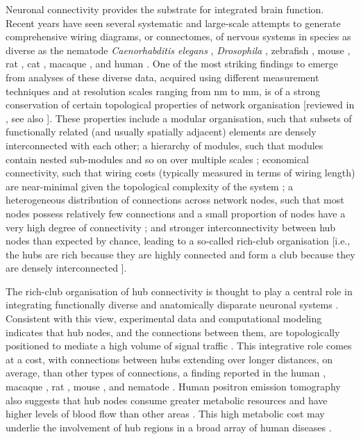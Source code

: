 Neuronal connectivity provides the substrate for integrated brain function.
Recent years have seen several systematic and large-scale attempts to generate comprehensive wiring diagrams, or connectomes, of nervous systems \citep{VandenHeuvel2016} in species as diverse as the nematode \emph{Caenorhabditis elegans} \citep{White1986, Varshney2011}, \emph{Drosophila} \citep{Chiang2011a, Shih2015}, zebrafish \citep{Wanner2016, Hildebrand2017}, mouse \citep{Oh2014, Zingg2014}, rat \citep{Bota2015}, cat \citep{Scannell1995}, macaque \citep{Markov2014, Stephan2001}, and human \citep{Hagmann2008, VanEssen2013}.
One of the most striking findings to emerge from analyses of these diverse data, acquired using different measurement techniques and at resolution scales ranging from nm to mm, is of a strong conservation of certain topological properties of network organisation [reviewed in \citep{Bullmore2009, Bullmore2012, Sporns2011, VandenHeuvel2016b, Schroter2017}, see also \citep{Fornito2016}].
These properties include a modular organisation, such that subsets of functionally related (and usually spatially adjacent) elements are densely interconnected with each other;
a hierarchy of modules, such that modules contain nested sub-modules and so on over multiple scales \citep{Meunier2010a, Bassett2010};
economical connectivity, such that wiring costs (typically measured in terms of wiring length) are near-minimal given the topological complexity of the system \citep{Betzel2016, Bassett2010};
a heterogeneous distribution of connections across network nodes, such that most nodes possess relatively few connections and a small proportion of nodes have a very high degree of connectivity \citep{VandenHeuvel2013b, Varshney2011};
and stronger interconnectivity between hub nodes than expected by chance, leading to a so-called rich-club organisation [i.e., the hubs are rich because they are highly connected and form a club because they are densely interconnected \citep{VandenHeuvel2011,Zamora-Lopez2010,DeReus2013b,Towlson2013,Shih2015}].

The rich-club organisation of hub connectivity is thought to play a central role in integrating functionally diverse and anatomically disparate neuronal systems \citep{Fornito2015,VandenHeuvel2013a,Zamora-Lopez2010, Crossley2014,Crossley2013}. Consistent with this view, experimental data and computational modeling indicates that hub nodes, and the connections between them, are topologically positioned to mediate a high volume of signal traffic \mbox{\citep{VandenHeuvel2012, Harriger2012, Misic2014, Misic2015a}}.
This integrative role comes at a cost, with connections between hubs extending over longer distances, on average, than other types of connections, a finding reported in the human \citep{VandenHeuvel2012}, macaque \mbox{\citep{Harriger2012}}, rat \citep{VandenHeuvel2016b}, mouse \citep{Fulcher2016}, and nematode \citep{Towlson2013}.
Human positron emission tomography also suggests that hub nodes consume greater metabolic resources and have higher levels of blood flow than other areas \citep{Tomasi2013, Collin2014, Liang2013a}.
This high metabolic cost may underlie the involvement of hub regions in a broad array of human diseases \citep{Fornito2015, Bullmore2012, Crossley2014}.

